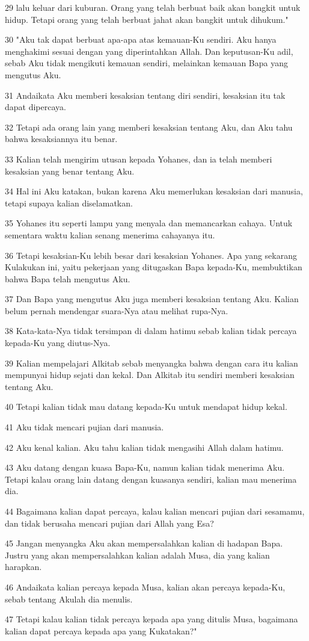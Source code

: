 \par 29 lalu keluar dari kuburan. Orang yang telah berbuat baik akan bangkit untuk hidup. Tetapi orang yang telah berbuat jahat akan bangkit untuk dihukum."
\par 30 "Aku tak dapat berbuat apa-apa atas kemauan-Ku sendiri. Aku hanya menghakimi sesuai dengan yang diperintahkan Allah. Dan keputusan-Ku adil, sebab Aku tidak mengikuti kemauan sendiri, melainkan kemauan Bapa yang mengutus Aku.
\par 31 Andaikata Aku memberi kesaksian tentang diri sendiri, kesaksian itu tak dapat dipercaya.
\par 32 Tetapi ada orang lain yang memberi kesaksian tentang Aku, dan Aku tahu bahwa kesaksiannya itu benar.
\par 33 Kalian telah mengirim utusan kepada Yohanes, dan ia telah memberi kesaksian yang benar tentang Aku.
\par 34 Hal ini Aku katakan, bukan karena Aku memerlukan kesaksian dari manusia, tetapi supaya kalian diselamatkan.
\par 35 Yohanes itu seperti lampu yang menyala dan memancarkan cahaya. Untuk sementara waktu kalian senang menerima cahayanya itu.
\par 36 Tetapi kesaksian-Ku lebih besar dari kesaksian Yohanes. Apa yang sekarang Kulakukan ini, yaitu pekerjaan yang ditugaskan Bapa kepada-Ku, membuktikan bahwa Bapa telah mengutus Aku.
\par 37 Dan Bapa yang mengutus Aku juga memberi kesaksian tentang Aku. Kalian belum pernah mendengar suara-Nya atau melihat rupa-Nya.
\par 38 Kata-kata-Nya tidak tersimpan di dalam hatimu sebab kalian tidak percaya kepada-Ku yang diutus-Nya.
\par 39 Kalian mempelajari Alkitab sebab menyangka bahwa dengan cara itu kalian mempunyai hidup sejati dan kekal. Dan Alkitab itu sendiri memberi kesaksian tentang Aku.
\par 40 Tetapi kalian tidak mau datang kepada-Ku untuk mendapat hidup kekal.
\par 41 Aku tidak mencari pujian dari manusia.
\par 42 Aku kenal kalian. Aku tahu kalian tidak mengasihi Allah dalam hatimu.
\par 43 Aku datang dengan kuasa Bapa-Ku, namun kalian tidak menerima Aku. Tetapi kalau orang lain datang dengan kuasanya sendiri, kalian mau menerima dia.
\par 44 Bagaimana kalian dapat percaya, kalau kalian mencari pujian dari sesamamu, dan tidak berusaha mencari pujian dari Allah yang Esa?
\par 45 Jangan menyangka Aku akan mempersalahkan kalian di hadapan Bapa. Justru yang akan mempersalahkan kalian adalah Musa, dia yang kalian harapkan.
\par 46 Andaikata kalian percaya kepada Musa, kalian akan percaya kepada-Ku, sebab tentang Akulah dia menulis.
\par 47 Tetapi kalau kalian tidak percaya kepada apa yang ditulis Musa, bagaimana kalian dapat percaya kepada apa yang Kukatakan?"

